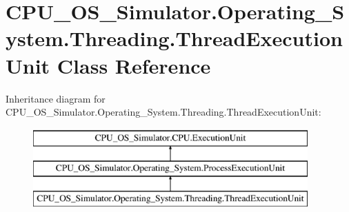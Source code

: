 \hypertarget{class_c_p_u___o_s___simulator_1_1_operating___system_1_1_threading_1_1_thread_execution_unit}{}\section{C\+P\+U\+\_\+\+O\+S\+\_\+\+Simulator.\+Operating\+\_\+\+System.\+Threading.\+Thread\+Execution\+Unit Class Reference}
\label{class_c_p_u___o_s___simulator_1_1_operating___system_1_1_threading_1_1_thread_execution_unit}
Inheritance diagram for C\+P\+U\+\_\+\+O\+S\+\_\+\+Simulator.\+Operating\+\_\+\+System.\+Threading.\+Thread\+Execution\+Unit\+:\begin{figure}[H]
\begin{center}
\leavevmode
\includegraphics[height=3.000000cm]{class_c_p_u___o_s___simulator_1_1_operating___system_1_1_threading_1_1_thread_execution_unit}
\end{center}
\end{figure}
